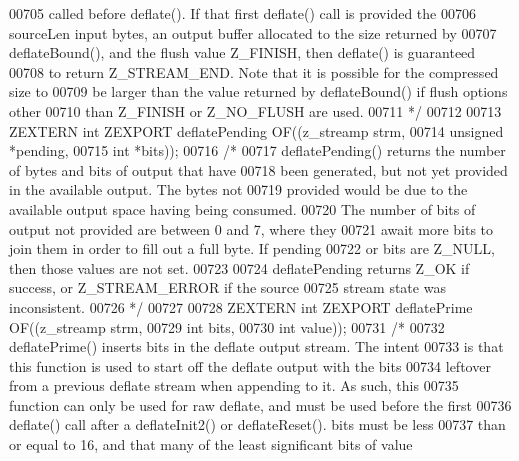 \begin{DoxyCode}
00705 \textcolor{comment}{   called before deflate().  If that first deflate() call is provided the}
00706 \textcolor{comment}{   sourceLen input bytes, an output buffer allocated to the size returned by}
00707 \textcolor{comment}{   deflateBound(), and the flush value Z\_FINISH, then deflate() is guaranteed}
00708 \textcolor{comment}{   to return Z\_STREAM\_END.  Note that it is possible for the compressed size to}
00709 \textcolor{comment}{   be larger than the value returned by deflateBound() if flush options other}
00710 \textcolor{comment}{   than Z\_FINISH or Z\_NO\_FLUSH are used.}
00711 \textcolor{comment}{*/}
00712 
00713 ZEXTERN \textcolor{keywordtype}{int} ZEXPORT deflatePending OF((z\_streamp strm,
00714                                        \textcolor{keywordtype}{unsigned} *pending,
00715                                        \textcolor{keywordtype}{int} *bits));
00716 \textcolor{comment}{/*}
00717 \textcolor{comment}{     deflatePending() returns the number of bytes and bits of output that have}
00718 \textcolor{comment}{   been generated, but not yet provided in the available output.  The bytes not}
00719 \textcolor{comment}{   provided would be due to the available output space having being consumed.}
00720 \textcolor{comment}{   The number of bits of output not provided are between 0 and 7, where they}
00721 \textcolor{comment}{   await more bits to join them in order to fill out a full byte.  If pending}
00722 \textcolor{comment}{   or bits are Z\_NULL, then those values are not set.}
00723 \textcolor{comment}{}
00724 \textcolor{comment}{     deflatePending returns Z\_OK if success, or Z\_STREAM\_ERROR if the source}
00725 \textcolor{comment}{   stream state was inconsistent.}
00726 \textcolor{comment}{ */}
00727 
00728 ZEXTERN \textcolor{keywordtype}{int} ZEXPORT deflatePrime OF((z\_streamp strm,
00729                                      \textcolor{keywordtype}{int} bits,
00730                                      \textcolor{keywordtype}{int} value));
00731 \textcolor{comment}{/*}
00732 \textcolor{comment}{     deflatePrime() inserts bits in the deflate output stream.  The intent}
00733 \textcolor{comment}{   is that this function is used to start off the deflate output with the bits}
00734 \textcolor{comment}{   leftover from a previous deflate stream when appending to it.  As such, this}
00735 \textcolor{comment}{   function can only be used for raw deflate, and must be used before the first}
00736 \textcolor{comment}{   deflate() call after a deflateInit2() or deflateReset().  bits must be less}
00737 \textcolor{comment}{   than or equal to 16, and that many of the least significant bits of value}

\end{DoxyCode}
